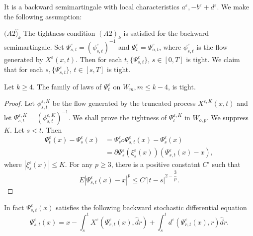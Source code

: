 It is a backward semimartingale with local characteristics
$a^\varepsilon, -b^\varepsilon + d^\varepsilon$. We make the following
assumption:  

$(A2\hat{)}_k$ The tightness condition $(A2)_k$ is satisfied for the
backward semimartingale. Set $\Psi^\varepsilon_{s,t} =
(\phi^\varepsilon_{s, t})^{-1}$ and $\Psi^\varepsilon_t =
\Psi^\varepsilon_{o,t}$, where $\phi^\varepsilon_{s,t}$ is the flow
generated by $X^\varepsilon (x, t)$. Then for each $t, \{
\Psi^\varepsilon_{s,t}\}$, $s \in [0, T]$ is tight. We claim
that for each $s, \{\Psi^\varepsilon_{s,t}\}$, $t \in[s, T]$ is
tight. 

\begin{theorem}\label{c3:thm3.11.1}\pageoriginale %
Let $k \ge 4$. The family of laws of $\Psi^\varepsilon_t$ 
on $W_m, m \le k-4$, is tight. 
\end{theorem}

\begin{proof} %
  Let $\phi^{\varepsilon, K}_{s,t}$ be the flow generated by the
  truncated process $X^{\varepsilon, K} (x, t)$ and let
  $\Psi^{\varepsilon, K}_{s, t} = (\phi^{\varepsilon, K}_{s,
    t})^{-1}$. We shall prove the tightness of $\Psi^{\varepsilon,
    K}_t$ in $W_{o, p} $. We suppress $K$. Let $s < t$. Then 
  \begin{align*}
    \Psi^\varepsilon_t (x) - \Psi^\varepsilon_s (x) & =
    \Psi^\varepsilon_s o \Psi^\varepsilon_{s, t} (x) -
    \Psi^\varepsilon_s (x)\\ 
    & = \partial \Psi^\varepsilon_s (\xi^\varepsilon_s (x))
  (\Psi^\varepsilon_{s, t}(x) - x), \tag {3.11.1}\label{c3:eq3.11.1} 
  \end{align*}
  where $| \xi^\varepsilon_s (x) | \le K$. For any $p \ge 3$, there is
  a positive constatnt $C'$ such that  
  $$
  E | \Psi^\varepsilon_{s,t} (x) - x |^p \le C' |t-s|^{2-\dfrac{3}{p}}.
  $$
\end{proof}

In fact $\Psi ^\varepsilon_{s,t}(x)$ satisfies the following backward
stochastic differential equation 
$$
\Psi^\varepsilon_{s, t}( x) = x - \int^t_s X^\varepsilon
(\Psi^\varepsilon_{r, t}(x), \hat{d}r) + \int^t_s d^\varepsilon
(\Psi^\varepsilon_{r, t}(x), r ) \hat{d}r. 
$$

